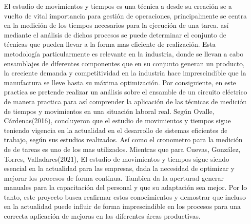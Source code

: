     El estudio de movimientos y tiempos es una técnica a desde su creación se a vuelto de vital importancia para gestión de operaciones, principalmente se centra en la medición de los tiempos necesarios para la ejecución de una tarea. así mediante el análisis de dichos procesos se puede determinar el conjunto de técnicas que pueden llevar a la forma mas eficiente de realización.
    Esta metodología particularmente es relevante en la industria, donde se llevan a cabo ensamblajes de diferentes componentes que en su conjunto generan un producto, la creciente demanda y competitividad en la industria hace imprescindible que la manufactura se lleve hasta su máxima optimización.
    Por consiguiente, en este practica se pretende realizar un análisis sobre el ensamble de un circuito eléctrico de manera practica para así comprender la aplicación de las técnicas de medición de tiempos y movimientos en una situación laboral real.
    Según Ovalle, Cárdenas(2016), concluyeron que el estudio de movimientos y tiempos sigue teniendo vigencia en la actualidad en el desarrollo de sistemas eficientes de trabajo, según sus estudios realizados. Así como el cronometro para la medición de de tareas es uno de los mas utilizados.
    Mientras que para Cuevas, González, Torres, Valladares(2021), El estudio de movimientos y tiempos sigue siendo esencial en la actualidad para las empresas, dada la necesidad de optimizar y mejorar los procesos de forma continua. Tambien da la aperturad generar manuales para la capacitación del personal y que su adaptación sea mejor.\cite{REF2}
    Por lo tanto, este proyecto busca reafirmar estos conocimientos y demostrar que incluso en la actualidad puede influir de forma imprescindible en los procesos para una correcta aplicación de mejoras en las diferentes áreas productivas. 
    
